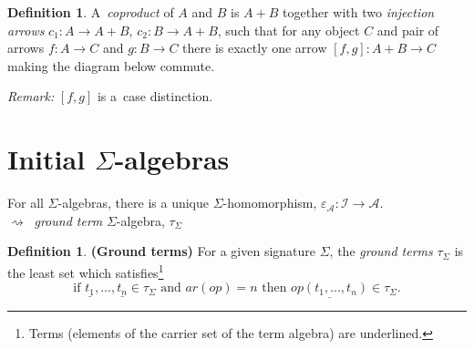 \documentclass{amsart}
\theoremstyle{definition}
\newtheorem{definition}[thm]{Definition}
\newcommand{\ca}{\mathcal A} %
\renewcommand{\emph}{\textit} %
\begin{document}
\begin{definition}
  A~\emph{coproduct} of $A$ and $B$ is $A+B$ together with two \emph{injection arrows} $c_{1}: A\to A+B$, $c_{2}: B \to A+B$, such that for any object $C$ and pair of arrows $f: A\to C$ and $g: B\to C$ there is exactly one arrow $[f,g]: A+B \to C$ making the diagram below commute.
  \begin{center}
  \end{center}
  \emph{Remark:} $[f,g]$ is a~case distinction. 
\end{definition}

\section{Initial $\Sigma$-algebras}
\begin{minipage}[b]{0.4\linewidth}
\begin{center}
\end{center}
\end{minipage}
\begin{minipage}[b]{0.5\linewidth}
For all $\Sigma$-algebras, there is a unique $\Sigma$-homomorphism, $\varepsilon_\ca : \mathcal I \to \ca$.\\
$\rightsquigarrow~$ \textit{ground term} $\Sigma$-algebra, $\tau_\Sigma$\\
\end{minipage}

\begin{definition}\textbf{(Ground terms)} For a given signature $\Sigma$, the \textit{ground terms} $\tau_\Sigma$ is the least set which satisfies\footnote{Terms (elements of the carrier set of the term algebra) are underlined.}
$$\text{if } \underline{t_1}, \dots, \underline{t_n} \in \tau_\Sigma \text{ and }ar(op) = n \text{ then } \underline{op(t_1, \dots, t_n)} \in \tau_\Sigma.$$
\end{definition}
\end{document}
